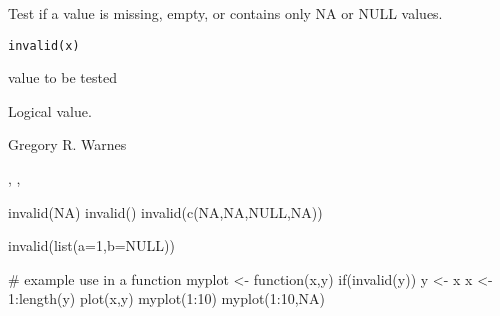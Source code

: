 \begin{Description}\relax
Test if a value is missing, empty, or contains only NA or NULL values.
\end{Description}
\begin{Usage}
\begin{verbatim}
invalid(x)
\end{verbatim}
\end{Usage}
\begin{Arguments}
\begin{ldescription}
\item[\code{x}] value to be tested
\end{ldescription}
\end{Arguments}
\begin{Value}
Logical value.
\end{Value}
\begin{Author}\relax
Gregory R. Warnes 
\end{Author}
\begin{SeeAlso}\relax
{}, ,
\end{SeeAlso}
\begin{Examples}
\begin{ExampleCode}

invalid(NA)
invalid()
invalid(c(NA,NA,NULL,NA))

invalid(list(a=1,b=NULL))

# example use in a function
myplot <- function(x,y) {
                if(invalid(y)) {
                        y <- x
                        x <- 1:length(y)
                }
                plot(x,y)
        }
myplot(1:10)
myplot(1:10,NA)
\end{ExampleCode}
\end{Examples}

